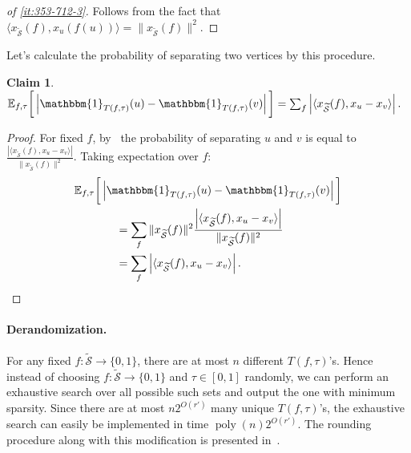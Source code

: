 \documentclass{article}
\newtheorem{claim}{Claim}[section]
\DeclareMathOperator{\poly}{poly}
\newcommand{\ind}[1]{\mathbbm{1}_{#1}}
\newcommand{\xvec}{\vec{x}} \newcommand{\yvec}{\vec{y}} \newcommand{\xmat}{\vec{X}} \newcommand{\ymat}{\vec{Y}} \newcommand{\zmat}{\vec{Z}}
\newcommand{\expct}[2]{\mathbb{E}_{#1}\bigg[ #2 \bigg]}
\newcounter{alg-count}
\def\ngap{}
\def\vec{}
\newcommand{\sdn}{{\widetilde{\mathcal{S}}}}
\begin{document}
\begin{proof}[of \eqref{it:353-712-3}]
  Follows from the fact that $\langle \xvec_\sdn(f),\xvec_u(f(u))
  \rangle = \|\xvec_\sdn(f)\|^2$.
\end{proof}
Let's calculate the probability of separating two vertices 
by this procedure.
\begin{claim}\label{clm:sep-prob}
  $\expct{f,\tau}{ \left|\ind{T(f,\tau)}(u)-
      \ind{T(f,\tau)}(v)\right|} = \sum_f \left|\langle
    \xvec_{\sdn}(f), \xvec_u - \xvec_v\rangle\right|.  $
\end{claim}
\begin{proof}
  For fixed $f$, by~ the probability of separating
  $u$ and $v$ is equal to $ \frac{\left|\langle \xvec_{\sdn}(f),
      \xvec_u - \xvec_v\rangle\right|}{\|\xvec_\sdn(f)\|^2}$.
Taking expectation over $f$:
\begin{multline*}
  \expct{f,\tau}{ \left|\ind{T(f,\tau)}(u)- \ind{T(f,\tau)}(v)\right|} \hfill\\
  \quad\quad\quad\quad= \sum_f \|\xvec_\sdn(f) \|^2
  \frac{\left|\langle \xvec_{\sdn}(f), \xvec_u -
      \xvec_v\rangle\right|}
  {\|\xvec_\sdn(f)\|^2} \hfill\\
  \quad\quad\quad\quad= \sum_f \left|\langle \xvec_{\sdn}(f), \xvec_u
    - \xvec_v\rangle\right|. \hfill \qedhere
\end{multline*}
\end{proof}

\paragraph{Derandomization.} 
For any fixed $f:\sdn\to\{0,1\}$, there are at most $n$ different
$T(f,\tau)$'s.  Hence instead of choosing $f:\sdn\to \{0,1\}$ and
$\tau\in [0,1]$ randomly, we can perform an exhaustive search over all
possible such sets and output the one with minimum sparsity.  Since
there are at most $n 2^{O(r')}$ many unique $T(f,\tau)$'s, the
exhaustive search can easily be implemented in time $\poly(n)
2^{O(r')}$.  The rounding procedure along with this modification is
presented in~.
\ngap
\end{document}
